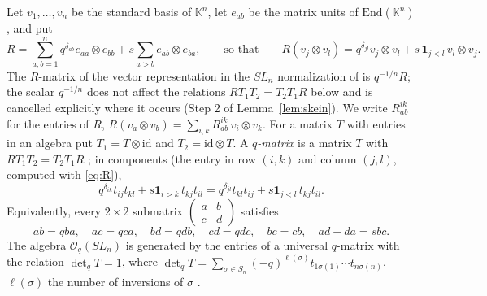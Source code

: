 \documentclass[12pt]{article}
\theoremstyle{remark}
\newcommand{\kk}{\mathbb K}
\newcommand{\ot}{\otimes}
\newcommand{\id}{\mathrm{id}}
\newcommand{\Oq}{\mathcal O_q(SL_n)}
\begin{document}
Let $v_1,\dots,v_n$ be the standard basis of $\kk^n$, let $e_{ab}$ be
the matrix units of $\mathrm{End}(\kk^n)$, and put
\begin{equation}\label{eq:R}
 R=\sum_{a,b=1}^n q^{\delta_{ab}}e_{aa}\ot e_{bb}
       +s\sum_{a>b}e_{ab}\ot e_{ba},
 \qquad\text{so that}\qquad
 R(v_j\ot v_l)=q^{\delta_{jl}}v_j\ot v_l+s\,\mathbf1_{j<l}\,v_l\ot v_j.
\end{equation}
The $R$-matrix of the vector representation in the $SL_n$
normalization of \cite[Section 3.1]{LY} is $q^{-1/n}R$; the scalar
$q^{-1/n}$ does not affect the relations $RT_1T_2=T_2T_1R$ below and
is cancelled explicitly where it occurs (Step 2 of
Lemma~\ref{lem:skein}). We write $R^{ik}_{ab}$ for the entries of $R$,
$R(v_a\ot v_b)=\sum_{i,k}R^{ik}_{ab}\,v_i\ot v_k$. For a matrix $T$ with
entries in an algebra put $T_1=T\ot\id$ and $T_2=\id\ot T$. A
\emph{$q$-matrix} is a matrix $T$ with $RT_1T_2=T_2T_1R$
\cite{FRT}; in components (the entry in row $(i,k)$ and column $(j,l)$,
computed with \eqref{eq:R}),
\begin{equation}\label{eq:RTTcomponent}
 q^{\delta_{ik}}t_{ij}t_{kl}+s\mathbf1_{i>k}\,t_{kj}t_{il}
 =q^{\delta_{jl}}t_{kl}t_{ij}+s\mathbf1_{j<l}\,t_{kj}t_{il}.
\end{equation}
Equivalently, every $2\times2$ submatrix
$\left(\begin{smallmatrix}a&b\\c&d\end{smallmatrix}\right)$ satisfies
\begin{equation}\label{eq:qmatrix}
 ab=qba,\quad ac=qca,\quad bd=qdb,\quad cd=qdc,\quad
 bc=cb,\quad ad-da=sbc .
\end{equation}
The algebra $\Oq$ is generated by the entries of a universal $q$-matrix
with the relation $\det_qT=1$, where
$\det_qT=\sum_{\sigma\in S_n}(-q)^{\ell(\sigma)}t_{1\sigma(1)}\cdots
t_{n\sigma(n)}$, $\ell(\sigma)$ the number of inversions of $\sigma$
\cite[Section 9.2]{KS}.
\end{document}
